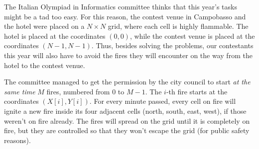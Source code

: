 \usepackage{xcolor}
\usepackage{afterpage}
\usepackage{pifont,mdframed}
\usepackage[bottom]{footmisc}
\usepackage[labelformat=empty]{caption}


\renewcommand{\inputfile}{\texttt{stdin}}
\renewcommand{\outputfile}{\texttt{stdout}}
\makeatletter
\renewcommand{\this@inputfilename}{\texttt{stdin}}
\renewcommand{\this@outputfilename}{\texttt{stdout}}
\makeatother

\newenvironment{warning}
  {\par\begin{mdframed}[linewidth=2pt,linecolor=gray]%
    \begin{list}{}{\leftmargin=1cm
                   \labelwidth=\leftmargin}\item[\Large\ding{43}]}
  {\end{list}\end{mdframed}\par}
\newenvironment{danger}
{\par\begin{mdframed}[linewidth=2pt,linecolor=red!60!yellow,backgroundcolor=red!20!white]%
		\begin{list}{}{\leftmargin=1cm
				\labelwidth=\leftmargin}\item[\Large\ding{45}]}
		{\end{list}\end{mdframed}\par}


The Italian Olympiad in Informatics committee thinks that this year's tasks might
be a tad too easy. For this reason, the contest venue in Campobasso and the
hotel were placed on a $N \times N$ grid, where each cell is highly flammable.
The hotel is placed at the coordinates $(0,0)$, while the contest venue is
placed at the coordinates $(N-1, N-1)$. Thus, besides solving the problems, our
contestants this year will also have to avoid the fires they will encounter on the
way from the hotel to the contest venue.

The committee managed to get the permission by the city council to start
\emph{at the same time} $M$ fires, numbered from $0$ to $M-1$. The $i$-th fire
starts at the coordinates $(X[i], Y[i])$. For every minute passed, every cell on
fire will ignite a new fire inside its four adjacent cells (north, south, east,
west), if those weren't on fire already. The fires will spread on the grid until
it is completely on fire, but they are controlled so that they won't escape the
grid (for public safety reasons).

